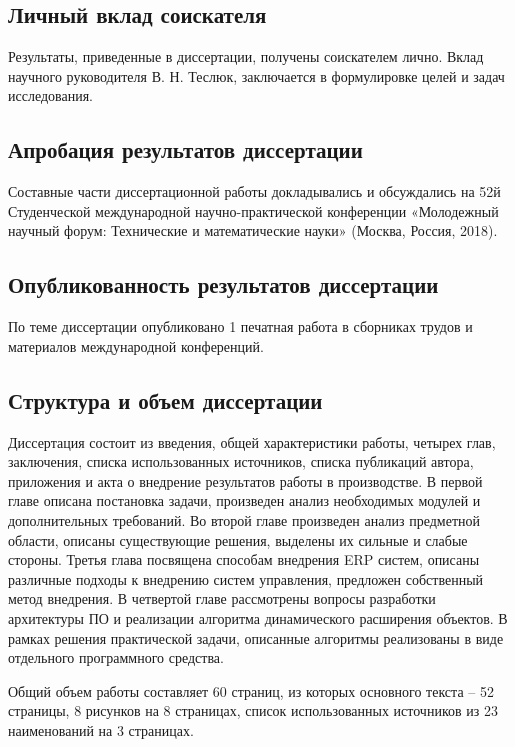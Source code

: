 \subsection*{Личный вклад соискателя}

Результаты, приведенные в диссертации, получены  соискателем лично.
Вклад научного руководителя В. Н. Теслюк, заключается в формулировке целей и задач исследования.

\subsection*{Апробация результатов диссертации}

Составные части диссертационной работы докладывались и обсуждались
на 52й Студенческой международной научно-практической конференции
«Молодежный научный форум: Технические и математические науки» (Москва, Россия, 2018).

\subsection*{Опубликованность результатов диссертации}

По теме диссертации опубликовано 1 печатная работа в сборниках трудов и материалов
международной конференций.


\subsection*{Структура и объем диссертации}

Диссертация состоит из введения, общей характеристики работы, четырех глав, заключения,
списка использованных источников, списка публикаций автора, приложения и акта о внедрение результатов
работы в производстве. В первой главе описана постановка задачи, произведен анализ необходимых
модулей и дополнительных требований. Во второй главе произведен анализ предметной области,
описаны существующие решения, выделены их сильные и слабые стороны.
Третья глава посвящена способам внедрения ERP систем, описаны различные подходы к внедрению
систем управления, предложен собственный метод внедрения.
В четвертой главе рассмотрены вопросы разработки архитектуры ПО и реализации алгоритма
динамического расширения объектов.
В рамках решения практической задачи, описанные алгоритмы реализованы в виде отдельного
программного средства.

Общий объем работы составляет 60 страниц, из которых основного текста – 52 страницы,
8 рисунков на 8 страницах, список использованных источников из 23 наименований на 3 страницах.
